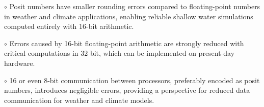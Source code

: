 \documentclass[draft]{agujournal2019}
\begin{document}





\begin{keypoints}
\item $\circ$ Posit numbers have smaller rounding errors compared to floating-point numbers in weather and climate applications, enabling reliable shallow water simulations computed entirely with 16-bit arithmetic.

\item $\circ$ Errors caused by 16-bit floating-point arithmetic are strongly reduced with critical computations in 32 bit, which can be implemented on present-day hardware.

\item $\circ$ 16 or even 8-bit communication between processors, preferably encoded as posit numbers, introduces negligible errors, providing a perspective for reduced data communication for weather and climate models.

\end{keypoints}

%
%

%
%
\end{document}
